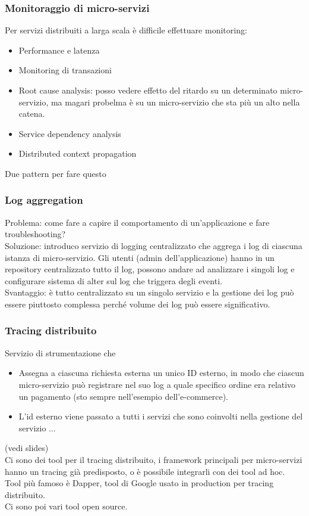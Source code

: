 \documentclass[16px]{article}
\begin{document}
\subsubsection{Monitoraggio di micro-servizi}
Per servizi distribuiti a larga scala è difficile effettuare monitoring:
\begin{itemize}
\item Performance e latenza
\item Monitoring di transazioni
\item Root cause analysis: posso vedere effetto del ritardo su un determinato micro-servizio, ma magari probelma è su un micro-servizio che sta più un alto nella catena.
\item Service dependency analysis
\item Distributed context propagation
\end{itemize}
Due pattern per fare questo
\subsubsection{Log aggregation}
Problema: come fare a capire il comportamento di un'applicazione e fare troubleshooting? \\ Soluzione: introduco servizio di logging centralizzato che aggrega i log di ciascuna istanza di micro-servizio. Gli utenti (admin dell'applicazione) hanno in un repository centralizzato tutto il log, possono andare ad analizzare i singoli log e configurare sistema di alter sul log che triggera degli eventi.\\ Svantaggio: è tutto centralizzato su un singolo servizio e la gestione dei log può essere piuttosto complessa perché volume dei log può essere significativo.
\subsubsection{Tracing distribuito}
Servizio di strumentazione che 
\begin{itemize}
\item Assegna a ciascuna richiesta esterna un unico ID esterno, in modo che ciascun micro-servizio può registrare nel suo log a quale specifico ordine era relativo un pagamento (sto sempre nell'esempio dell'e-commerce).
\item L'id esterno viene passato a tutti i servizi che sono coinvolti nella gestione del servizio
...
\end{itemize}
(vedi slides)\\
Ci sono dei tool per il tracing distribuito, i framework principali per micro-servizi hanno un tracing già predisposto, o è possibile integrarli con dei tool ad hoc.\\ Tool più famoso è Dapper, tool di Google usato in production per tracing distribuito.\\ Ci sono poi vari tool open source. 
\end{document}
